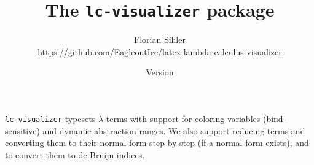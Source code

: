 \documentclass[parskip=half,english,numbers=noenddot,footnotes=nomultiple,oneside]{scrartcl}
\title{The \texttt{lc-visualizer} package}
\author{%
	\texorpdfstring{Florian Sihler\medskip\\[-2mm]
		{\scriptsize\url{https://github.com/EagleoutIce/latex-lambda-calculus-visualizer}}%
	}{Florian Sihler}}
\date{Version \lcdocversion{} \textendash{} \lcdocdate}
\begin{document}
\maketitle
\thispagestyle{empty}

\noindent\texttt{lc-visualizer} typesets \(\lambda\)-terms with support for coloring variables (bind-sensitive) and dynamic abstraction ranges. We also support reducing terms and converting them to their normal form step by step (if a normal-form exists), and to convert them to de Bruijn indices.
\begin{example}
\end{example}
\begin{example}
\end{example}

\tableofcontents
\end{document}
